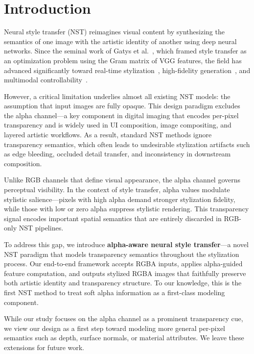\section{Introduction}

Neural style transfer (NST) reimagines visual content by synthesizing the semantics of one image with the artistic identity of another using deep neural networks. 
Since the seminal work of Gatys et al.~\cite{gatys2016image}, which framed style transfer as an optimization problem using the Gram matrix of VGG features, the field has advanced significantly toward real-time stylization~\cite{huang2017arbitrary}, high-fidelity generation~\cite{kwon2024aesfa}, and multimodal controllability~\cite{ahn2024dreamstyler}.

However, a critical limitation underlies almost all existing NST models: the assumption that input images are fully opaque. This design paradigm excludes the alpha channel—a key component in digital imaging that encodes per-pixel transparency and is widely used in UI composition, image compositing, and layered artistic workflows. As a result, standard NST methods ignore transparency semantics, which often leads to undesirable stylization artifacts such as edge bleeding, occluded detail transfer, and inconsistency in downstream composition.

Unlike RGB channels that define visual appearance, the alpha channel governs perceptual visibility. In the context of style transfer, alpha values modulate stylistic salience—pixels with high alpha demand stronger stylization fidelity, while those with low or zero alpha suppress stylistic rendering. This transparency signal encodes important spatial semantics that are entirely discarded in RGB-only NST pipelines.

To address this gap, we introduce \textbf{alpha-aware neural style transfer}—a novel NST paradigm that models transparency semantics throughout the stylization process. Our end-to-end framework accepts RGBA inputs, applies alpha-guided feature computation, and outputs stylized RGBA images that faithfully preserve both artistic identity and transparency structure. To our knowledge, this is the first NST method to treat soft alpha information as a first-class modeling component.

While our study focuses on the alpha channel as a prominent transparency cue, we view our design as a first step toward modeling more general per-pixel semantics such as depth, surface normals, or material attributes. We leave these extensions for future work.

